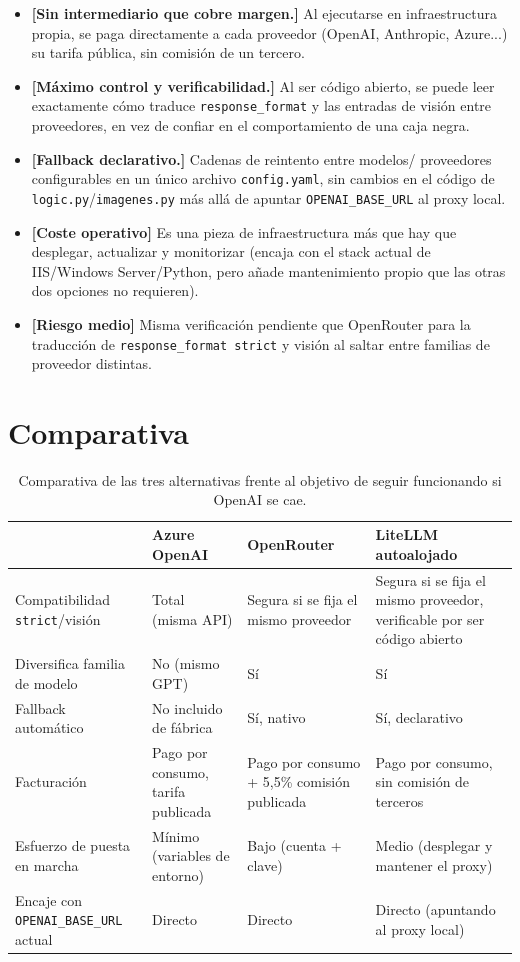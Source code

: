 \documentclass[11pt,a4paper]{article}
\newcommand{\riesgo}[1]{\textcolor{riesgoalto}{\textbf{[#1]}}}
\newcommand{\advertencia}[1]{\textcolor{riesgomedio}{\textbf{[#1]}}}
\newcommand{\ok}[1]{\textcolor{riesgobajo}{\textbf{[#1]}}}
\begin{document}
\begin{itemize}
    \item \ok{Sin intermediario que cobre margen.} Al ejecutarse en
    infraestructura propia, se paga directamente a cada proveedor (OpenAI,
    Anthropic, Azure...) su tarifa pública, sin comisión de un tercero.
    \item \ok{Máximo control y verificabilidad.} Al ser código abierto, se
    puede leer exactamente cómo traduce \texttt{response\_format} y las
    entradas de visión entre proveedores, en vez de confiar en el
    comportamiento de una caja negra.
    \item \ok{Fallback declarativo.} Cadenas de reintento entre modelos/
    proveedores configurables en un único archivo \texttt{config.yaml}, sin
    cambios en el código de \texttt{logic.py}/\texttt{imagenes.py} más allá de
    apuntar \texttt{OPENAI\_BASE\_URL} al proxy local.
    \item \riesgo{Coste operativo} Es una pieza de infraestructura más que hay
    que desplegar, actualizar y monitorizar (encaja con el stack actual de
    IIS/Windows Server/Python, pero añade mantenimiento propio que las otras
    dos opciones no requieren).
    \item \advertencia{Riesgo medio} Misma verificación pendiente que
    OpenRouter para la traducción de \texttt{response\_format strict} y visión
    al saltar entre familias de proveedor distintas.
\end{itemize}

\section{Comparativa}

\begin{table}[h]
\centering
\small
\begin{tabular}{p{3cm}p{3.3cm}p{3.3cm}p{3.3cm}}
\toprule
& \textbf{Azure OpenAI} & \textbf{OpenRouter} & \textbf{LiteLLM autoalojado} \\
\midrule
Compatibilidad \texttt{strict}/visión & Total (misma API) & Segura si se fija el mismo proveedor & Segura si se fija el mismo proveedor, verificable por ser código abierto \\
\addlinespace
Diversifica familia de modelo & No (mismo GPT) & Sí & Sí \\
\addlinespace
Fallback automático & No incluido de fábrica & Sí, nativo & Sí, declarativo \\
\addlinespace
Facturación & Pago por consumo, tarifa publicada & Pago por consumo + 5,5\% comisión publicada & Pago por consumo, sin comisión de terceros \\
\addlinespace
Esfuerzo de puesta en marcha & Mínimo (variables de entorno) & Bajo (cuenta + clave) & Medio (desplegar y mantener el proxy) \\
\addlinespace
Encaje con \texttt{OPENAI\_BASE\_URL} actual & Directo & Directo & Directo (apuntando al proxy local) \\
\bottomrule
\end{tabular}
\caption{Comparativa de las tres alternativas frente al objetivo de seguir
funcionando si OpenAI se cae.}
\end{table}
\end{document}

